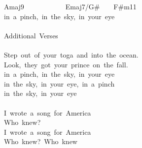 {Amaj9\ \ \ \ \ \ \ \ \ \ \ \ Emaj7/G\#\ \ \ \ F\#m11\\
in\ a\ pinch,\ in\ the\ sky,\ in\ your\ eye\\
\\
Additional\ Verses\\
\\
Step\ out\ of\ your\ toga\ and\ into\ the\ ocean.\\
Look,\ they\ got\ your\ prince\ on\ the\ fall.\\
in\ a\ pinch,\ in\ the\ sky,\ in\ your\ eye\\
in\ the\ sky,\ in\ your\ eye,\ in\ a\ pinch\\
in\ the\ sky,\ in\ your\ eye\\
\\
I\ wrote\ a\ song\ for\ America\\
Who\ knew?\\
I\ wrote\ a\ song\ for\ America\\
Who\ knew?\ Who\ knew}
